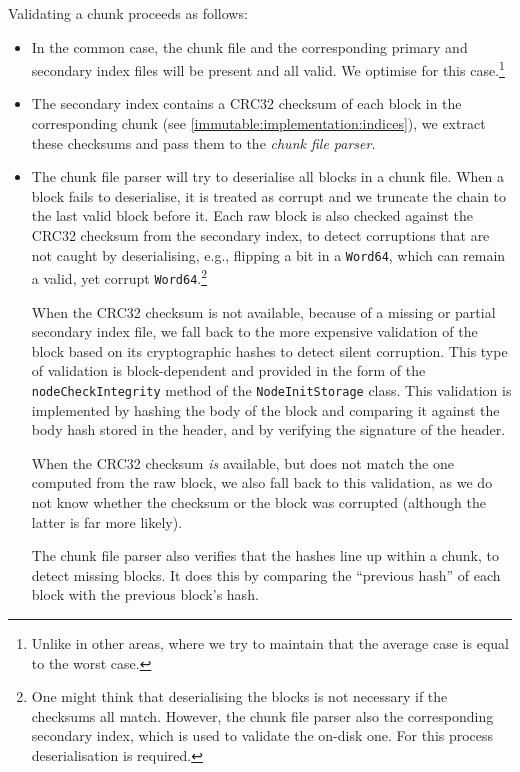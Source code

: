 Validating a chunk proceeds as follows:
\begin{itemize}
\item In the common case, the chunk file and the corresponding primary and
  secondary index files will be present and all valid. We optimise for this
  case.\footnote{Unlike in other areas, where we try to maintain that the
  average case is equal to the worst case.}

\item The secondary index contains a CRC32 checksum of each block in the
  corresponding chunk (see \cref{immutable:implementation:indices}), we extract
  these checksums and pass them to the \emph{chunk file parser}.

\item The chunk file parser will try to deserialise all blocks in a chunk file.
  When a block fails to deserialise, it is treated as corrupt and we truncate
  the chain to the last valid block before it. Each raw block is also checked
  against the CRC32 checksum from the secondary index, to detect corruptions
  that are not caught by deserialising, e.g., flipping a bit in a
  \lstinline!Word64!, which can remain a valid, yet corrupt
  \lstinline!Word64!.\footnote{One might think that deserialising the blocks is
  not necessary if the checksums all match. However, the chunk file parser also
  the corresponding secondary index, which is used to validate the on-disk one.
  For this process deserialisation is required.}

  When the CRC32 checksum is not available, because of a missing or partial
  secondary index file, we fall back to the more expensive validation of the
  block based on its cryptographic hashes to detect silent corruption. This type
  of validation is block-dependent and provided in the form of the
  \lstinline!nodeCheckIntegrity! method of the \lstinline!NodeInitStorage!
  class. This validation is implemented by hashing the body of the block and
  comparing it against the body hash stored in the header, and by verifying the
  signature of the header.

  When the CRC32 checksum \emph{is} available, but does not match the one
  computed from the raw block, we also fall back to this validation, as we do
  not know whether the checksum or the block was corrupted (although the latter
  is far more likely).

  The chunk file parser also verifies that the hashes line up within a chunk, to
  detect missing blocks. It does this by comparing the ``previous hash'' of each
  block with the previous block's hash.


\end{itemize}
